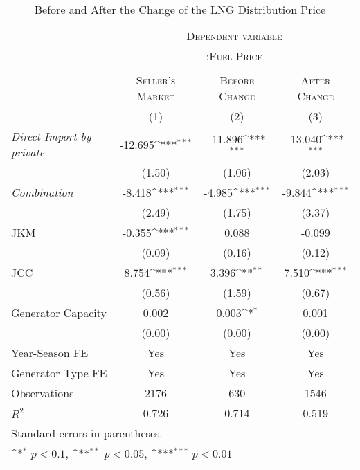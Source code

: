\documentclass[12pt]{article}
\begin{document}
\begin{table}[htbp]\centering
\def\sym#1{\ifmmode^{#1}\else\(^{#1}\)\fi}
\caption{Before and After the Change of the LNG Distribution Price\label{tab1}}
\renewcommand{\arraystretch}{0.7}
\begin{tabular}{l*{3}{c}}
\toprule
 & \multicolumn{3}{c}{\textsc{Dependent variable}} \\ 
                     &\multicolumn{3}{c}{\textsc{:Fuel Price}}\\
                                          \cline{2-4}  \\
                    &\multicolumn{1}{c}{\textsc{Seller's Market}}&\multicolumn{1}{c}{\textsc{Before Change}}&\multicolumn{1}{c}{\textsc{After Change}}\\
 &\multicolumn{1}{c}{(1)}&\multicolumn{1}{c}{(2)}&\multicolumn{1}{c}{(3)}\\ 
\hline \hline
\addlinespace
\textit{Direct Import by private}               &     -12.695\sym{***}&     -11.896\sym{***}&     -13.040\sym{***}\\
                    &      (1.50)         &      (1.06)         &      (2.03)         \\
\addlinespace
\textit{Combination} &      -8.418\sym{***}&      -4.985\sym{***}&      -9.844\sym{***}\\
                    &      (2.49)         &      (1.75)         &      (3.37)         \\
\addlinespace
JKM                 &      -0.355\sym{***}&       0.088         &      -0.099         \\
                    &      (0.09)         &      (0.16)         &      (0.12)         \\
\addlinespace
JCC                 &       8.754\sym{***}&       3.396\sym{**} &       7.510\sym{***}\\
                    &      (0.56)         &      (1.59)         &      (0.67)         \\
\addlinespace
Generator Capacity           &       0.002         &       0.003\sym{*}  &       0.001         \\
                    &      (0.00)         &      (0.00)         &      (0.00)         \\
\midrule
Year-Season FE         &    Yes &    Yes&    Yes\\  
Generator Type FE        &    Yes &    Yes&    Yes\\  
Observations                    &    2176         &     630         &    1546         \\
$R^2$                  &       0.726         &       0.714         &       0.519         \\
\bottomrule
\multicolumn{4}{l}{\footnotesize Standard errors in parentheses.}\\
\multicolumn{4}{l}{\footnotesize \sym{*} \(p<0.1\), \sym{**} \(p<0.05\), \sym{***} \(p<0.01\)}\\
\end{tabular}
\end{table}
\end{document}
